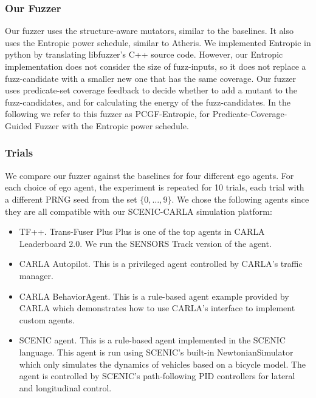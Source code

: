 \subsubsection{Our Fuzzer}
Our fuzzer uses the structure-aware mutators, similar to the baselines.
%
It also uses the Entropic power schedule, similar to Atheris.
%
We implemented Entropic in python by translating libfuzzer's C++ source code.
%
However, our Entropic implementation does not consider the size of fuzz-inputs, so it does not replace a fuzz-candidate with a smaller new one that has the same coverage.
%
Our fuzzer uses predicate-set coverage feedback to decide whether to add a mutant to the fuzz-candidates, and for calculating the energy of the fuzz-candidates.
%
In the following we refer to this fuzzer as PCGF-Entropic, for Predicate-Coverage-Guided Fuzzer with the Entropic power schedule.


\subsubsection{Trials}
We compare our fuzzer against the baselines for four different ego agents.
%
For each choice of ego agent, the experiment is repeated for 10 trials, each trial with a different PRNG seed from the set $\{ 0, \dots, 9 \}$.
%
We chose the following agents since they are all compatible with our SCENIC-CARLA simulation platform:
\begin{itemize}
    \item TF++.
        Trans-Fuser Plus Plus \cite{Jaeger.2023} is one of the top agents in CARLA Leaderboard 2.0.
        We run the SENSORS Track version of the agent.
    \item CARLA Autopilot.
        This is a privileged agent controlled by CARLA's traffic manager.
    \item CARLA BehaviorAgent.
        This is a rule-based agent example provided by CARLA which demonstrates how to use CARLA's interface to implement custom agents.
    \item SCENIC agent.
        This is a rule-based agent implemented in the SCENIC language.
        This agent is run using SCENIC's built-in NewtonianSimulator which only simulates the dynamics of vehicles based on a bicycle model.
        The agent is controlled by SCENIC's path-following PID controllers for lateral and longitudinal control.
\end{itemize}


